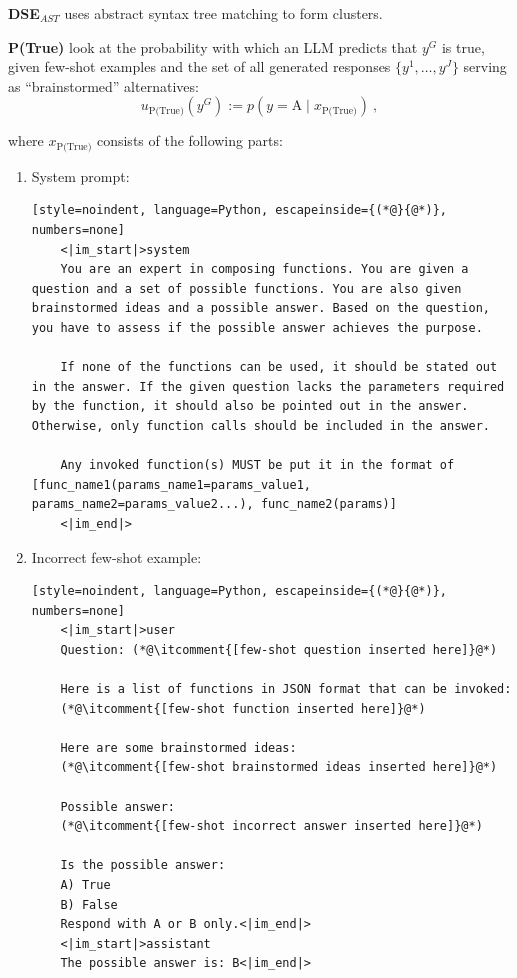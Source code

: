 \textbf{DSE}$_{AST}$ uses abstract syntax tree matching to form clusters. 


\textbf{P(True)} \citet{kadavath2022languagemodelsmostlyknow} look at the probability with which an LLM predicts that $y^G$ is true, given few-shot examples and the set of all generated responses $\{y^1, \dots, y^J\}$ serving as ``brainstormed'' alternatives:
\begin{equation}
    u_{\text{P(True)}}(y^G) := p(y = \text{A} \mid x_{\text{P(True)}}) \ ,
\end{equation}

where $x_{\text{P(True)}}$ consists of the following parts:
\begin{enumerate}
    \item System prompt:
    \begin{lstlisting}[style=noindent, language=Python, escapeinside={(*@}{@*)}, numbers=none]
    <|im_start|>system
    You are an expert in composing functions. You are given a question and a set of possible functions. You are also given brainstormed ideas and a possible answer. Based on the question, you have to assess if the possible answer achieves the purpose.
    
    If none of the functions can be used, it should be stated out in the answer. If the given question lacks the parameters required by the function, it should also be pointed out in the answer. Otherwise, only function calls should be included in the answer.
    
    Any invoked function(s) MUST be put it in the format of [func_name1(params_name1=params_value1, params_name2=params_value2...), func_name2(params)]
    <|im_end|>
    \end{lstlisting}
    \item Incorrect few-shot example: 
    \begin{lstlisting}[style=noindent, language=Python, escapeinside={(*@}{@*)}, numbers=none]
    <|im_start|>user
    Question: (*@\itcomment{[few-shot question inserted here]}@*)

    Here is a list of functions in JSON format that can be invoked:
    (*@\itcomment{[few-shot function inserted here]}@*)
    
    Here are some brainstormed ideas:
    (*@\itcomment{[few-shot brainstormed ideas inserted here]}@*)
    
    Possible answer:
    (*@\itcomment{[few-shot incorrect answer inserted here]}@*)
    
    Is the possible answer:
    A) True
    B) False
    Respond with A or B only.<|im_end|>
    <|im_start|>assistant
    The possible answer is: B<|im_end|>
     \end{lstlisting}


\end{enumerate}
